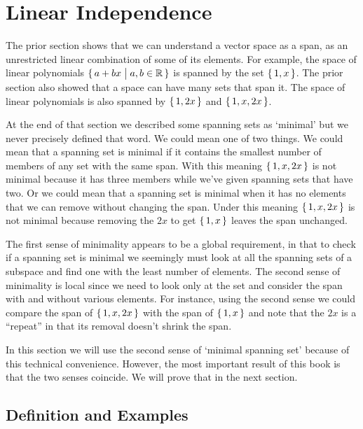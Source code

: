 \section{Linear Independence}
The prior section shows that we can understand a vector space
as a span, 
as an unrestricted linear combination of some of its elements.
For example, the space of linear polynomials $\mbox{$\{\,a+bx\bigm| a,b\in\mathbb{R}\,\}$}$ 
is spanned by the set $\mbox{$\{\,1,x\,\}$}$.
The prior section also showed that a space can have many sets that span it.
The space of linear polynomials is also spanned by 
$\mbox{$\{\,1,2x\,\}$}$ and $\mbox{$\{\,1,x,2x\,\}$}$.

At the end of that section we described some spanning sets as `minimal'
but we never precisely defined that word.
We could mean one of two things.
We could mean that a spanning set is minimal if it 
contains the smallest number of members of any set with the same span.
With this meaning $\mbox{$\{\,1,x,2x\,\}$}$ is not minimal because it has 
three members while we've given spanning sets that have two.
Or we could mean that a spanning set is minimal when it has no elements 
that we can remove without changing the span.
Under this meaning $\mbox{$\{\,1,x,2x\,\}$}$ is not minimal because 
removing the \( 2x \) to get \( \mbox{$\{\,1,x\,\}$} \) leaves the
span unchanged.

The first sense of minimality appears to be a global requirement, 
in that to check if a spanning set is minimal 
we seemingly must look at all the spanning sets of 
a subspace and find one with the least number of elements. 
The second sense of minimality is local since
we need to look only at the set and consider the
span with and without various elements.
For instance, using the second sense
we could compare the span of $\mbox{$\{\,1,x,2x\,\}$}$ 
with the span of $\mbox{$\{\,1,x\,\}$}$ and
note that the $2x$ is a ``repeat'' in that its removal doesn't shrink the span.

In this section we will use the second sense of `minimal spanning set'
because of this technical convenience.
However, the most important result of this book is that the two senses 
coincide. 
We will prove that in the next section.









\subsection{Definition and Examples}

